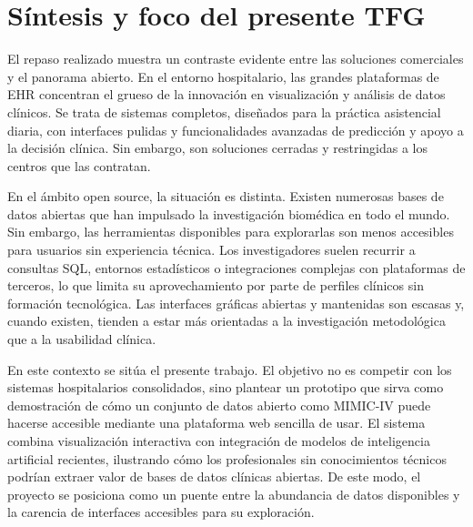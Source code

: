 \section{Síntesis y foco del presente TFG}

El repaso realizado muestra un contraste evidente entre las soluciones comerciales y el panorama abierto. En el entorno hospitalario, las grandes plataformas de EHR concentran el grueso de la innovación en visualización y análisis de datos clínicos. Se trata de sistemas completos, diseñados para la práctica asistencial diaria, con interfaces pulidas y funcionalidades avanzadas de predicción y apoyo a la decisión clínica. Sin embargo, son soluciones cerradas y restringidas a los centros que las contratan.

En el ámbito open source, la situación es distinta. Existen numerosas bases de datos abiertas que han impulsado la investigación biomédica en todo el mundo. Sin embargo, las herramientas disponibles para explorarlas son menos accesibles para usuarios sin experiencia técnica. Los investigadores suelen recurrir a consultas SQL, entornos estadísticos o integraciones complejas con plataformas de terceros, lo que limita su aprovechamiento por parte de perfiles clínicos sin formación tecnológica. Las interfaces gráficas abiertas y mantenidas son escasas y, cuando existen, tienden a estar más orientadas a la investigación metodológica que a la usabilidad clínica.

En este contexto se sitúa el presente trabajo. El objetivo no es competir con los sistemas hospitalarios consolidados, sino plantear un prototipo que sirva como demostración de cómo un conjunto de datos abierto como MIMIC-IV puede hacerse accesible mediante una plataforma web sencilla de usar. El sistema combina visualización interactiva con integración de modelos de inteligencia artificial recientes, ilustrando cómo los profesionales sin conocimientos técnicos podrían extraer valor de bases de datos clínicas abiertas. De este modo, el proyecto se posiciona como un puente entre la abundancia de datos disponibles y la carencia de interfaces accesibles para su exploración.

